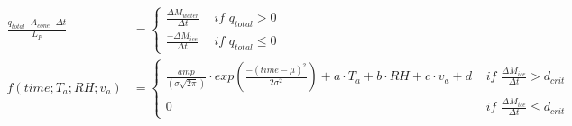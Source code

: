 \documentclass[utf8]{frontiersSCNS}
\begin{document}
\begin{subequations}
	\begin{align}
		\label{eqn:SW}
  \frac{q_{total} \cdot A_{cone} \cdot \Delta t}{L_F} & = \left\{ \begin{array}{ll}
		\frac{\Delta M_{water}}{\Delta t} & \textit{ if } q_{total} > 0 \\
		\frac{-\Delta M_{ice}}{\Delta t} & \textit{ if } q_{total} \leq 0
	\end{array} \right. \\
  f(time;T_a;RH;v_a) & = \left\{ \begin{array}{ll}
		\frac{amp}{(\sigma \sqrt{2\pi})} \cdot
    exp\left(\frac{-(time-\mu)^2}{2\sigma^2}\right) + a \cdot T_a + b \cdot RH + c \cdot v_a + d
    & \textit{ if } \frac{\Delta M_{ice}}{\Delta t} > d_{crit} \\
		0 & \textit{ if } \frac{\Delta M_{ice}}{\Delta t} \leq d_{crit}
	\end{array} \right.
	\end{align}
\end{subequations}


\end{document}

